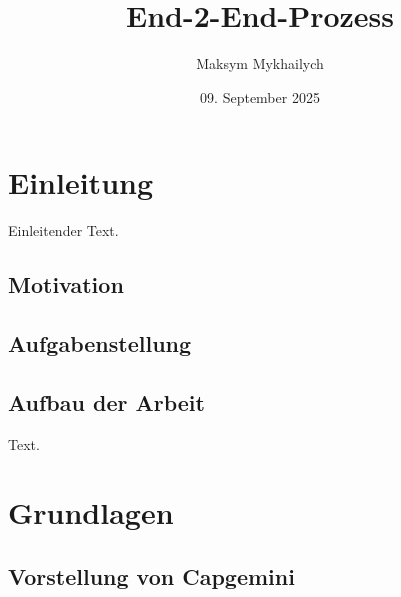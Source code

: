 \documentclass[a4paper, 12pt]{scrartcl}
\title{End-2-End-Prozess}
\author{Maksym Mykhailych}
\date{09. September 2025}
\begin{document}
	\maketitle
	\newpage 	
	\tableofcontents
	\newpage
	
	\newpage
	\section{Einleitung}
	Einleitender Text.
	\newpage
	\subsection{Motivation}
	\subsection{Aufgabenstellung}
	\subsection{Aufbau der Arbeit}
	Text.
	\newpage
	\section{Grundlagen}
	\subsection{Vorstellung von Capgemini}
\end{document}

